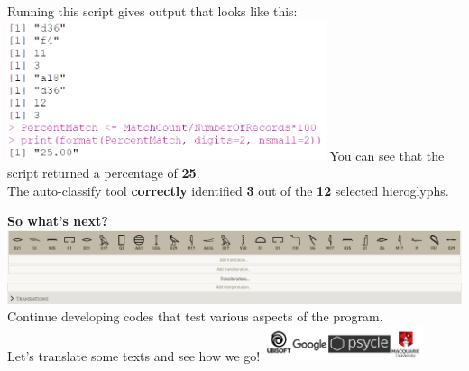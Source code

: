 \documentclass[unknownkeysallowed,usepdftitle=false, parskip=full, aspectratio=169]{beamer}
\newcommand{\secvariable}{nothing}
\newcommand{\mysection}[1]{\renewcommand{\secvariable}{#1}
}
\begin{document}
\begin{frame}\label{\secvariable}

\begin{center}
Running this script gives output that looks like this:
\includegraphics[width=0.7\textwidth,keepaspectratio]{figure/output.PNG}
You can see that the script returned a percentage of \textbf{25}.
\\The auto-classify tool \textbf{correctly} identified \textbf{3} out of the \textbf{12} selected hieroglyphs.
\end{center}

\end{frame}

\mysection{conclusion}

\begin{frame}\label{\secvariable}

\begin{center}

\textbf{So what's next?}
\vfill
\includegraphics[width=1.0\textwidth,keepaspectratio]{figure/translations_2.PNG}
\vfill
Continue developing codes that test various aspects of the program.
\\Let's translate some texts and see how we go!
\vfill
\includegraphics[width=0.35\textwidth,keepaspectratio]{figure/LOGOS.PNG}

\end{center}

\end{frame}
\end{document}
